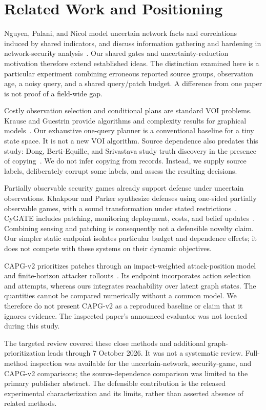 \documentclass[manuscript,screen,nonacm]{acmart}
\begin{document}
\section{Related Work and Positioning}
Nguyen, Palani, and Nicol model uncertain network facts and correlations induced by shared indicators, and discuss information gathering and hardening in network-security analysis~\cite{nguyen}. Our shared gates and uncertainty-reduction motivation therefore extend established ideas. The distinction examined here is a particular experiment combining erroneous reported source groups, observation age, a noisy query, and a shared query/patch budget. A difference from one paper is not proof of a field-wide gap.

Costly observation selection and conditional plans are standard VOI problems. Krause and Guestrin provide algorithms and complexity results for graphical models~\cite{krause}. Our exhaustive one-query planner is a conventional baseline for a tiny state space. It is not a new VOI algorithm. Source dependence also predates this study: Dong, Berti-Equille, and Srivastava study truth discovery in the presence of copying~\cite{dong}. We do not infer copying from records. Instead, we supply source labels, deliberately corrupt some labels, and assess the resulting decisions.

Partially observable security games already support defense under uncertain observations. Khakpour and Parker synthesize defenses using one-sided partially observable games, with a sound transformation under stated restrictions~\cite{khakpour}. CyGATE includes patching, monitoring deployment, costs, and belief updates~\cite{cygate}. Combining sensing and patching is consequently not a defensible novelty claim. Our simpler static endpoint isolates particular budget and dependence effects; it does not compete with these systems on their dynamic objectives.

CAPG-v2 prioritizes patches through an impact-weighted attack-position model and finite-horizon attacker rollouts~\cite{capg}. Its endpoint incorporates action selection and attempts, whereas ours integrates reachability over latent graph states. The quantities cannot be compared numerically without a common model. We therefore do not present CAPG-v2 as a reproduced baseline or claim that it ignores evidence. The inspected paper's announced evaluator was not located during this study.

The targeted review covered these close methods and additional graph-prioritization leads through 7 October 2026. It was not a systematic review. Full-method inspection was available for the uncertain-network, security-game, and CAPG-v2 comparisons; the source-dependence comparison was limited to the primary publisher abstract. The defensible contribution is the released experimental characterization and its limits, rather than asserted absence of related methods.
\end{document}
